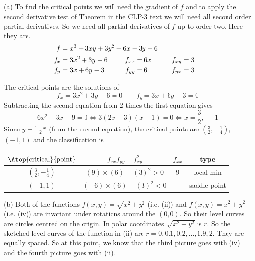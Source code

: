 \begin{solution}
(a)
To find the critical points we will need the
gradient of $f$ and to apply the second derivative test of 
Theorem  in the CLP-3 text 
we will need all 
second order partial derivatives. So we need all partial derivatives of
$f$ up to order two.
Here they are.
\begin{alignat*}{3}
f&=x^3 + 3xy + 3y^2 - 6x - 3y - 6 \hidewidth\\
f_x&=3x^2+3y-6   & f_{xx}&=6x \qquad & f_{xy}&= 3\\
f_y&=3x+6y-3 \qquad & f_{yy}&=6\qquad & f_{yx}&= 3
\end{alignat*}

The critical points are the solutions of
\begin{equation*}
f_x=3x^2+3y-6=0   \qquad
f_y=3x+6y-3 = 0
\end{equation*}
Subtracting the second equation from $2$ times the first equation gives
\begin{equation*}
6x^2-3x-9=0
\iff
3(2x-3)(x+1)=0
\iff x=\frac{3}{2},\ -1
\end{equation*}
Since $y=\frac{1-x}{2}$ (from the second equation),
the critical points are $(\frac{3}{2},-\frac{1}{4})$, $(-1,1)$ and 
the classification is
\begin{center}
\renewcommand{\arraystretch}{1.3}
     \begin{tabular}{|c|c|c|c|}
     \hline
    $\Atop{\text{critical}}{\text{point}}$  & $f_{xx}f_{yy}-f_{xy}^2$ & 
                                                          $f_{xx}$ & type \\    
    \hline
     $(\frac{3}{2},-\frac{1}{4})$  & $(9)\times(6)-(3)^2> 0$ & $9$   
                       & local min  \\ \hline
     $(-1,1)$  & $(-6)\times (6)-(3)^2<0$ &   & saddle point \\  \hline
     \end{tabular}
\renewcommand{\arraystretch}{1.0}
\end{center}

(b) Both of the functions  $f(x, y) = \sqrt{x^2 + y^2}$ (i.e. (ii))
and  $f(x, y) = x^2 + y^2$ (i.e. (iv)) are invariant under rotations
around the $(0,0)$. So their level curves are circles centred on 
the origin. In polar coordinates $\sqrt{x^2 + y^2}$ is $r$. 
So the sketched level curves of the function in (ii) are
$r = 0, 0.1, 0.2, \ldots , 1.9, 2$. They are equally spaced.
So at this point, we know that the third picture goes with (iv)
and the fourth picture goes with (ii).


\end{solution}

